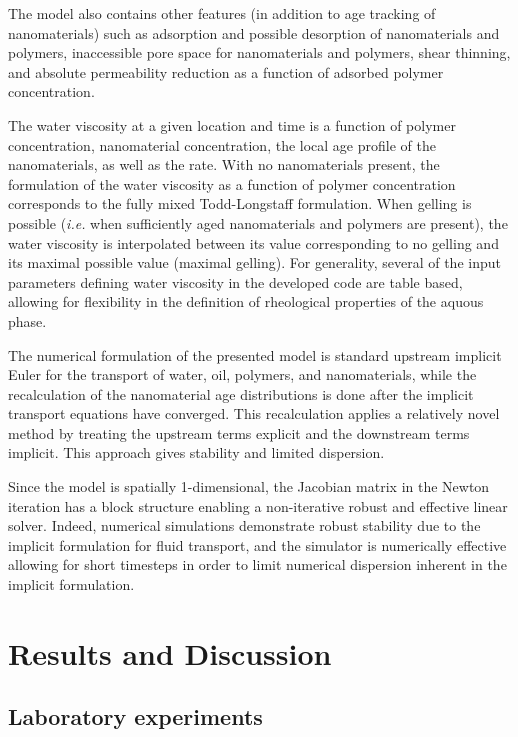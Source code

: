 \documentclass[nanomaterials,article,submit,moreauthors,pdftex]{Definitions/mdpi}
\begin{document}
The model also contains other features (in addition to age tracking of nanomaterials) such as adsorption and possible desorption of nanomaterials and polymers, inaccessible pore space for nanomaterials and polymers, shear thinning, and absolute permeability reduction as a function of adsorbed polymer concentration. 

The water viscosity at a given location and time is a function of polymer concentration, nanomaterial concentration, the local age profile of the nanomaterials, as well as the rate. With no nanomaterials present, the formulation of the water viscosity as a function of polymer concentration corresponds to the fully mixed Todd-Longstaff formulation. When gelling is possible (\textit{i.e.} when sufficiently aged nanomaterials and polymers are present), the water viscosity is interpolated between its value corresponding to no gelling and its maximal possible value (maximal gelling).  For generality, several of the input parameters defining water viscosity in the developed code are table based, allowing for flexibility in the definition of rheological properties of the aquous phase.

The numerical formulation of the presented model is standard upstream implicit Euler for the transport of water, oil, polymers, and nanomaterials, while the recalculation of the nanomaterial age distributions is done after the implicit transport equations have converged. This recalculation applies a relatively novel method \citep{Flatten2008} by treating the upstream terms explicit and the downstream terms implicit. This approach gives stability and limited dispersion. 

Since the model is spatially 1-dimensional, the Jacobian matrix in the Newton iteration has a block structure enabling a non-iterative robust and effective linear solver. Indeed, numerical simulations demonstrate robust stability due to the implicit formulation for fluid transport, and the simulator is numerically effective allowing for short timesteps in order to limit numerical dispersion inherent in the implicit formulation.


\section{Results and Discussion}
\subsection{Laboratory experiments}
\end{document}
